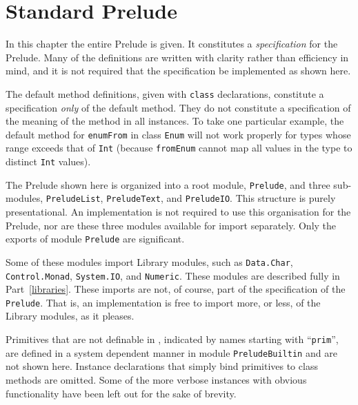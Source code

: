 %
%
\chapter{Standard Prelude}
\label{stdprelude}

In this chapter the entire \Haskell{} Prelude is given.  It constitutes
a {\em specification} for the Prelude.  Many of the definitions are
written with clarity rather than efficiency in mind, 
and it is not required that the specification be implemented as shown here.

The default method definitions, given with \mbox{\tt class} declarations, constitute
a specification {\em only} of the default method.  They do not constitute a
specification of the meaning of the method in all instances.  To take
one particular example, the default method for \mbox{\tt enumFrom} in class \mbox{\tt Enum}
will not work properly for types whose range exceeds that of \mbox{\tt Int} (because
\mbox{\tt fromEnum} cannot map all values in the type to distinct \mbox{\tt Int} values).

The Prelude shown here is organized into a root module, \mbox{\tt Prelude},
and three sub-modules, \mbox{\tt PreludeList}, \mbox{\tt PreludeText}, and \mbox{\tt PreludeIO}.
This structure is purely presentational.
An implementation is not required to use 
this organisation for the Prelude,
nor are these three modules available for import separately.
Only the exports of module \mbox{\tt Prelude} are significant.

Some of these modules import Library modules, such as \mbox{\tt Data.Char}, \mbox{\tt Control.Monad}, \mbox{\tt System.IO},
and \mbox{\tt Numeric}.  These modules are described fully in Part~\ref{libraries}.
These imports are not, of course, part of the specification
of the \mbox{\tt Prelude}.  That is, an implementation is free to import more, or less,
of the Library modules, as it pleases.

Primitives that
are not definable in \Haskell{}, indicated by names starting with ``\mbox{\tt prim}'', are
defined in a system dependent manner in module \mbox{\tt PreludeBuiltin} and
are not shown here.  Instance declarations that simply bind primitives to
class methods are omitted.  Some of the more verbose instances with
obvious functionality have been left out for the sake of brevity.

